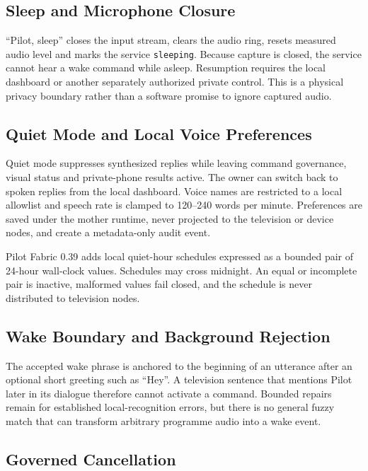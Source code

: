 \subsection{Sleep and Microphone Closure}

``Pilot, sleep'' closes the input stream, clears the audio ring, resets measured
audio level and marks the service \texttt{sleeping}.  Because capture is closed,
the service cannot hear a wake command while asleep.  Resumption requires the
local dashboard or another separately authorized private control.  This is a
physical privacy boundary rather than a software promise to ignore captured
audio.

\subsection{Quiet Mode and Local Voice Preferences}

Quiet mode suppresses synthesized replies while leaving command governance,
visual status and private-phone results active.  The owner can switch back to
spoken replies from the local dashboard.  Voice names are restricted to a local
allowlist and speech rate is clamped to 120--240 words per minute.  Preferences
are saved under the mother runtime, never projected to the television or device
nodes, and create a metadata-only audit event.

Pilot Fabric 0.39 adds local quiet-hour schedules expressed as a bounded pair of
24-hour wall-clock values. Schedules may cross midnight. An equal or incomplete
pair is inactive, malformed values fail closed, and the schedule is never
distributed to television nodes.

\subsection{Wake Boundary and Background Rejection}

The accepted wake phrase is anchored to the beginning of an utterance after an
optional short greeting such as ``Hey''. A television sentence that mentions
Pilot later in its dialogue therefore cannot activate a command. Bounded repairs
remain for established local-recognition errors, but there is no general fuzzy
match that can transform arbitrary programme audio into a wake event.

\subsection{Governed Cancellation}

